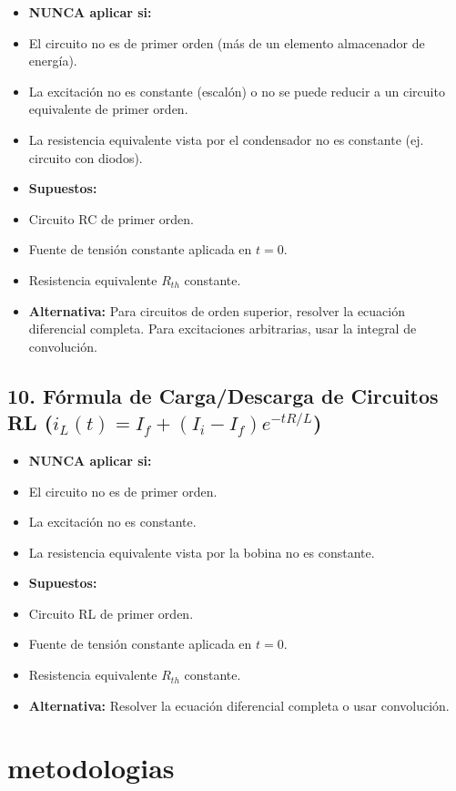 \documentclass[11pt,a4paper]{article}
\begin{document}
\begin{itemize}[leftmargin=*,topsep=2pt,itemsep=1pt]
  \item \textbf{NUNCA aplicar si:}
  \item El circuito no es de primer orden (más de un elemento almacenador de energía).
  \item La excitación no es constante (escalón) o no se puede reducir a un circuito equivalente de primer orden.
  \item La resistencia equivalente vista por el condensador no es constante (ej. circuito con diodos).
  \item \textbf{Supuestos:}
  \item Circuito RC de primer orden.
  \item Fuente de tensión constante aplicada en $t=0$.
  \item Resistencia equivalente $R_{th}$ constante.
  \item \textbf{Alternativa:} Para circuitos de orden superior, resolver la ecuación diferencial completa. Para excitaciones arbitrarias, usar la integral de convolución.
\end{itemize}


\subsection*{10. Fórmula de Carga/Descarga de Circuitos RL ($i_L(t) = I_f + (I_i - I_f)e^{-tR/L}$)}


\begin{itemize}[leftmargin=*,topsep=2pt,itemsep=1pt]
  \item \textbf{NUNCA aplicar si:}
  \item El circuito no es de primer orden.
  \item La excitación no es constante.
  \item La resistencia equivalente vista por la bobina no es constante.
  \item \textbf{Supuestos:}
  \item Circuito RL de primer orden.
  \item Fuente de tensión constante aplicada en $t=0$.
  \item Resistencia equivalente $R_{th}$ constante.
  \item \textbf{Alternativa:} Resolver la ecuación diferencial completa o usar convolución.
\end{itemize}


\section*{metodologias}
\end{document}
